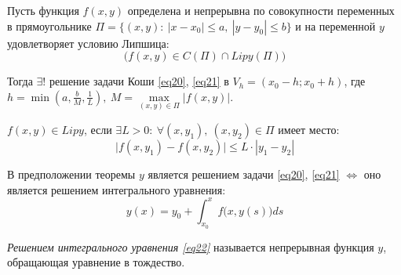 \begin{theorem}
    Пусть функция $f(x,y)$ определена и непрерывна по совокупности переменных в прямоугольнике $\Pi = \{(x,y): \ |x-x_0| \leqslant a, \ |y-y_0|\leqslant b\}$ и на переменной $y$ удовлетворяет условию Липшица:
    \[
        \big(f(x,y)\in C(\Pi) \cap Lip y(\Pi)\big)
    \]

    Тогда $\exists!$ решение задачи Коши \ref{eq20}, \ref{eq21} в $V_h = (x_0 - h;x_0 + h)$, где $h = \min\left(a,\frac{b}{M},\frac{1}{L}\right), \ M = \underset{(x,y)\in \Pi}{\max}\big|f(x,y)\big|$.
\end{theorem}

\begin{definition}
    $f(x,y)\in Lip y$, если $\exists L > 0: \ \forall (x,y_1), \ (x,y_2)\in \Pi$ имеет место:
    \[
        \big|f(x,y_1) - f(x,y_2)\big| \leqslant L \cdot |y_1 - y_2|
    \]
\end{definition}

\begin{lemma}
    В предположении теоремы $y$ является решением задачи \ref{eq20}, \ref{eq21} $\iff$ оно является решением интегрального уравнения:
    \begin{equation}\label{eq22}
        y(x) = y_0 + \int_{x_0}^{x}f\big(x,y(s)\big)ds
    \end{equation}
\end{lemma}

\begin{definition}
    \emph{Решением интегрального уравнения \ref{eq22}} называется непрерывная функция $y$, обращающая уравнение в тождество.
\end{definition}

